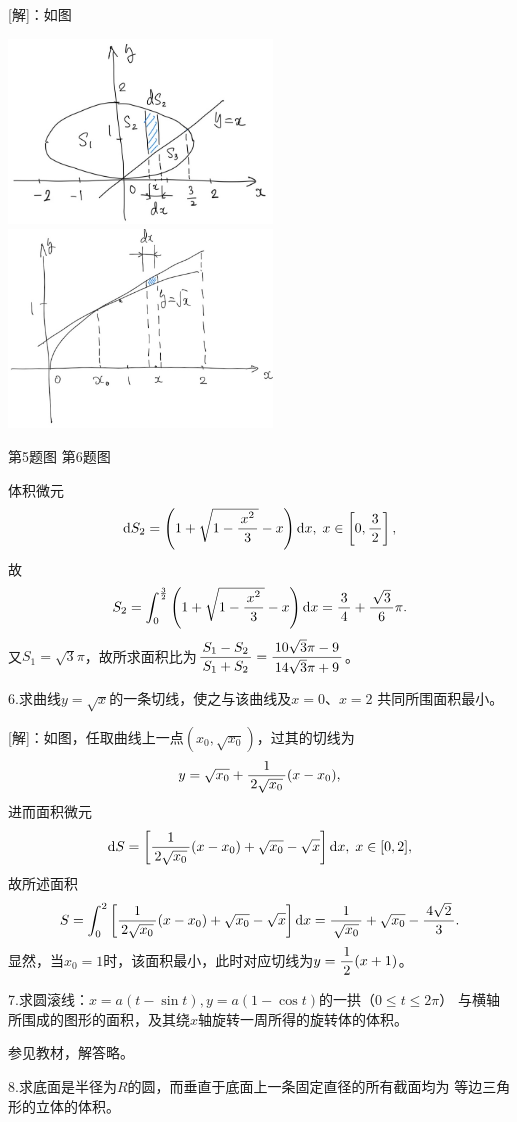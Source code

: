 [解]：如图
\begin{center}
	\includegraphics[width=7cm]{./images/ch6/ecXY.jpg}
	\includegraphics[width=7cm]{./images/ch6/ySqtXx.jpg}
	
	{\kaishu 第5题图\hspace{7cm} 第6题图}
\end{center}
体积微元
$$\mathrm{d} S_2=\left(1+\sqrt{1-\displaystyle\frac{\,{x^2}\,}{\,{3}\,}}-x\right)\mathrm{d} x,\;x\in\left[0,\displaystyle\frac{\,{3}\,}{\,{2}\,}\right],$$
故
$$S_2=\displaystyle\int_0^{\frac32}\left(1+\sqrt{1-\displaystyle\frac{\,{x^2}\,}{\,{3}\,}}-x\right)\mathrm{d} x
=\displaystyle\frac{\,{3}\,}{\,{4}\,}+\displaystyle\frac{\,{\sqrt3}\,}{\,{6}\,}\pi.$$
又$S_1=\sqrt3\pi$，故所求面积比为$\displaystyle\frac{\,{S_1-S_2}\,}{\,{S_1+S_2}\,}=\displaystyle\frac{\,{10\sqrt3\pi-9}\,}{\,{14\sqrt3\pi+9}\,}$。
\fin

6.求曲线$y=\sqrt x$的一条切线，使之与该曲线及$x=0$、$x=2$
共同所围面积最小。

[解]：如图，任取曲线上一点$(x_0,\sqrt{x_0})$，过其的切线为
$$y=\sqrt{x_0}+\displaystyle\frac{\,{1}\,}{\,{2\sqrt{x_0}}\,}(x-x_0),$$
进而面积微元
$$\mathrm{d} S=\left[\displaystyle\frac{\,{1}\,}{\,{2\sqrt{x_0}}\,}(x-x_0)+\sqrt{x_0}-\sqrt{x}\right]\mathrm{d}
x,\;x\in[0,2],$$ 故所述面积
$$S=\displaystyle\int_0^2\left[\displaystyle\frac{\,{1}\,}{\,{2\sqrt{x_0}}\,}(x-x_0)+\sqrt{x_0}-\sqrt{x}\right]\mathrm{d}
x=\displaystyle\frac{\,{1}\,}{\,{\sqrt{x_0}}\,}+\sqrt{x_0}-\displaystyle\frac{\,{4\sqrt2}\,}{\,{3}\,}.$$
显然，当$x_0=1$时，该面积最小，此时对应切线为$y=\displaystyle\frac{\,{1}\,}{\,{2}\,}(x+1)$。
\fin

\bs

7.求圆滚线：$x=a(t-\sin t),y=a(1-\cos t)$的一拱（$0\leq t\leq 2\pi$）
与横轴所围成的图形的面积，及其绕$x$轴旋转一周所得的旋转体的体积。

参见教材，解答略。

8.求底面是半径为$R$的圆，而垂直于底面上一条固定直径的所有截面均为
等边三角形的立体的体积。

